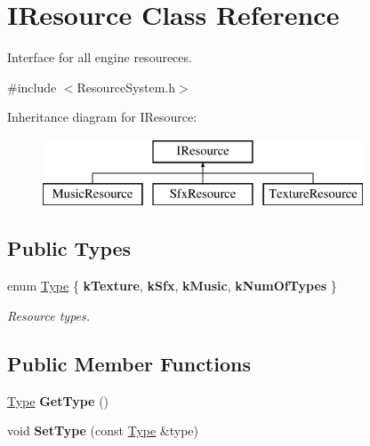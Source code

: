 \hypertarget{class_i_resource}{}\section{I\+Resource Class Reference}
\label{class_i_resource}


Interface for all engine resoureces.  




{\ttfamily \#include $<$Resource\+System.\+h$>$}

Inheritance diagram for I\+Resource\+:\begin{figure}[H]
\begin{center}
\leavevmode
\includegraphics[height=2.000000cm]{class_i_resource}
\end{center}
\end{figure}
\subsection*{Public Types}
\begin{DoxyCompactItemize}
\item 
\mbox{\label{class_i_resource_a693b751055bf043ebcd424a89831397f}} 
enum \mbox{\hyperlink{class_i_resource_a693b751055bf043ebcd424a89831397f}{Type}} \{ {\bfseries k\+Texture}, 
{\bfseries k\+Sfx}, 
{\bfseries k\+Music}, 
{\bfseries k\+Num\+Of\+Types}
 \}
\begin{DoxyCompactList}\small\item\em Resource types. \end{DoxyCompactList}\end{DoxyCompactItemize}
\subsection*{Public Member Functions}
\begin{DoxyCompactItemize}
\item 
\mbox{\label{class_i_resource_a733c11618b98cacd022566dc6fce29c6}} 
\mbox{\hyperlink{class_i_resource_a693b751055bf043ebcd424a89831397f}{Type}} {\bfseries Get\+Type} ()
\item 
\mbox{\label{class_i_resource_a445ec646f31cc4fb46fa94a666d9c891}} 
void {\bfseries Set\+Type} (const \mbox{\hyperlink{class_i_resource_a693b751055bf043ebcd424a89831397f}{Type}} \&type)
\end{DoxyCompactItemize}

